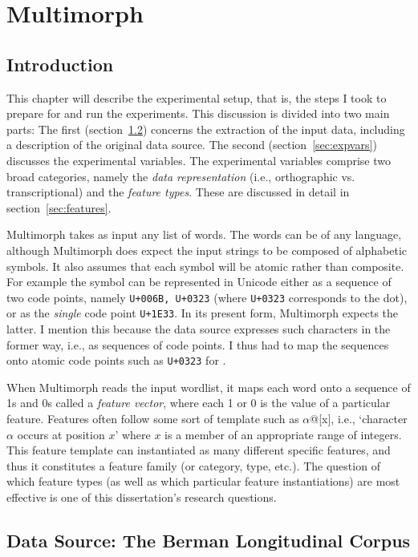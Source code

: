 \chapter{Multimorph}
\label{ch:experi}
\section{Introduction}
This chapter will describe the experimental setup, that is, the steps I took to prepare for and run the experiments. This discussion
is divided into two main parts: The first (section~\ref{sec:datasource}) concerns the extraction of the input data, including a description of the original data source. The second (section~\ref{sec:expvars}) discusses the experimental variables. The experimental variables comprise two broad categories, namely the \emph{data representation} (i.e., orthographic vs. transcriptional) and the \emph{feature types}. These are discussed in detail in section~\ref{sec:features}. 

Multimorph takes as input any list of words. The words can be of any
language, although Multimorph does expect the input strings to be composed
of alphabetic symbols. It also assumes that each symbol will be atomic rather
than composite. 
For example the symbol \textsf{} can be represented in Unicode either 
as a sequence of two code points, namely \texttt{U+006B, U+0323} 
(where \texttt{U+0323}
corresponds to the dot), or as the \emph{single} code point \texttt{U+1E33}. 
In its present form, Multimorph 
expects the latter. I mention this because the data source 
expresses
such characters in the former way, i.e., as sequences of code points. I thus had
to map the sequences onto atomic code points such as \texttt{U+0323} 
for \textsf{}.

When Multimorph reads the input wordlist, 
it maps each word onto
a sequence of 1s and 0s called a \emph{feature vector}, 
where each 1 or 0 is the value of a
particular feature. 
Features often follow some sort of template such as $\alpha$@[x], i.e., `character $\alpha$ occurs at position $x$' where $x$ is a member of an appropriate range of integers. This feature template can instantiated as many different specific features, and thus it constitutes a feature family (or category, type, etc.). The question of which feature types (as well as which particular feature instantiations) are most effective is one of this dissertation's research questions. 

\section{Data Source: The Berman Longitudinal Corpus}
\label{sec:datasource}
